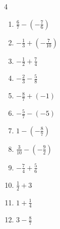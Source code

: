 \begin{multicols}{4}
\begin{enumerate}
  \item $\displaystyle \frac{6}{7} - \left(-\frac{7}{6}\right)$


  \item $\displaystyle -\frac{1}{3} + \left(-\frac{7}{10}\right)$


  \item $\displaystyle -\frac{1}{2} + \frac{7}{4}$


  \item $\displaystyle -\frac{2}{3} - \frac{5}{8}$


  \item $\displaystyle -\frac{8}{7} + \left(-1\right)$


  \item $\displaystyle -\frac{5}{7} - \left(-5\right)$


\columnbreak %

  \item $\displaystyle 1 - \left(-\frac{8}{7}\right)$


  \item $\displaystyle \frac{3}{10} - \left(-\frac{9}{2}\right)$


  \item $\displaystyle -\frac{7}{4} + \frac{5}{6}$


  \item $\displaystyle \frac{1}{2} + 3$


  \item $\displaystyle 1 + \frac{1}{4}$


  \item $\displaystyle 3 - \frac{8}{7}$


\end{enumerate}
\end{multicols}
